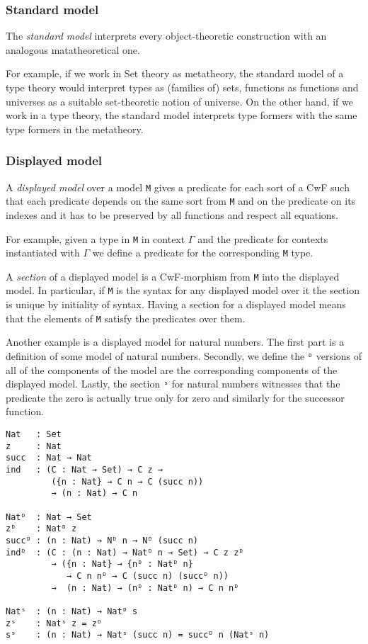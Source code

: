 \subsubsection{Standard model}

The \emph{standard model} interprets every object-theoretic construction with an analogous matatheoretical one.

For example, if we work in Set theory as metatheory, the standard model of a type theory would interpret types as (families of) sets, functions as functions and universes as a suitable set-theoretic notion of universe. On the other hand, if we work in a type theory, the standard model interprets type formers with the same type formers in the metatheory.

\subsubsection{Displayed model}

A \emph{displayed model} over a model \texttt{M} gives a predicate for each sort of a CwF such that each predicate depends on the same sort from \texttt{M} and on the predicate on its indexes and it has to be preserved by all functions and respect all equations.

For example, given a type in \texttt{M} in context $\Gamma$ and the predicate for contexts instantiated with $\Gamma$ we define a predicate for the corresponding \texttt{M} type.

A \emph{section} of a displayed model is a CwF-morphism from \texttt{M} into the displayed model. In particular, if \texttt{M} is the syntax for any displayed model over it the section is unique by initiality of syntax. Having a section for a displayed model means that the elements of \texttt{M} satisfy the predicates over them.

Another example is a displayed model for natural numbers. The first part is a definition of some model of natural numbers. Secondly, we define the \texttt{ᴰ} versions of all of the components of the model are the corresponding components of the displayed model. Lastly, the section \texttt{ˢ} for natural numbers witnesses that the predicate the zero is actually true only for zero and similarly for the successor function.

\begin{verbatim}
Nat   : Set
z     : Nat
succ  : Nat → Nat
ind   : (C : Nat → Set) → C z →
         ({n : Nat} → C n → C (succ n))
         → (n : Nat) → C n

Natᴰ  : Nat → Set
zᴰ    : Natᴰ z
succᴰ : (n : Nat) → Nᴰ n → Nᴰ (succ n)
indᴰ  : (C : (n : Nat) → Natᴰ n → Set) → C z zᴰ
         → ({n : Nat} → {nᴰ : Natᴰ n}
            → C n nᴰ → C (succ n) (succᴰ n))
         →  (n : Nat) → (nᴰ : Natᴰ n) → C n nᴰ

Natˢ  : (n : Nat) → Natᴰ s
zˢ    : Natˢ z = zᴰ
sˢ    : (n : Nat) → Natˢ (succ n) = succᴰ n (Natˢ n)
\end{verbatim}

